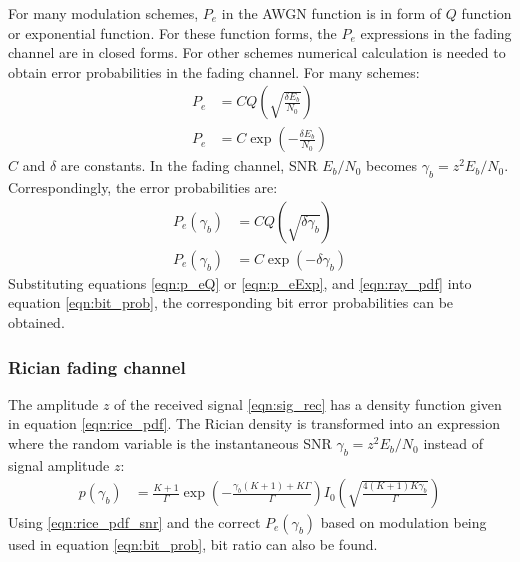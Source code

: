 For many modulation schemes, $P_e$ in the AWGN function is in form of $Q$ function or exponential function. For these function forms, the $P_e$ expressions in the fading channel are in closed forms. For other schemes numerical calculation is needed to obtain error probabilities in the fading channel. For many schemes:
\begin{align*}
P_e &= CQ\left(\sqrt{\frac{\delta E_b}{N_0}}\right)\\
P_e &= C \exp \left( - \frac{\delta E_b}{N_0} \right)
\end{align*}
$C$ and $\delta$ are constants. In the fading channel, \gls{SNR} $E_b/N_0$ becomes $\gamma_b = z^2E_b/N_0$. Correspondingly, the error probabilities are:
\begin{align}
P_e(\gamma_b) &= CQ\left(\sqrt{\delta\gamma_b}\right)\label{eqn:p_eQ}\\
P_e(\gamma_b) &= C \exp (-\delta\gamma_b)\label{eqn:p_eExp}
\end{align}
Substituting equations \eqref{eqn:p_eQ} or \eqref{eqn:p_eExp}, and \eqref{eqn:ray_pdf} into equation \eqref{eqn:bit_prob}, the corresponding bit error probabilities can be obtained.

\subsubsection{Rician fading channel}
The amplitude $z$ of the received signal \eqref{eqn:sig_rec} has a density function given in equation \eqref{eqn:rice_pdf}. The Rician density is transformed into an expression where the random variable is the instantaneous \gls{SNR} $\gamma_b = z^2E_b/N_0$ instead of signal amplitude $z$:
\begin{align}
p(\gamma_b) &= \frac{K+1}{\Gamma}\exp\left(-\frac{\gamma_b(K+1)+K\Gamma}{\Gamma}\right)I_0\left(\sqrt{\frac{4(K+1)K\gamma_b}{\Gamma}}\right)
\label{eqn:rice_pdf_snr}
\end{align}
Using \eqref{eqn:rice_pdf_snr} and the correct $P_e(\gamma_b)$ based on modulation being used in equation \eqref{eqn:bit_prob}, bit ratio can also be found.
